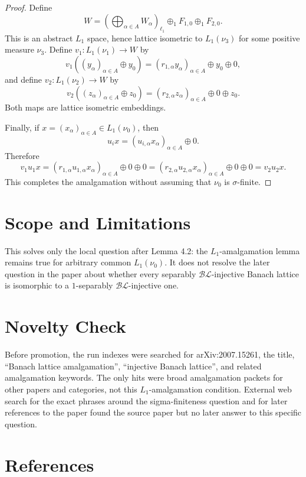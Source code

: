\documentclass[11pt]{article}
\newcommand{\BL}{\mathcal{BL}}
\newcommand{\Lone}{L_1}
\begin{document}
\begin{proof}
Define
\[
  W=
  \left(\bigoplus_{\alpha\in A}W_\alpha\right)_{\ell_1}
  \oplus_1 F_{1,0}\oplus_1 F_{2,0}.
\]
This is an abstract \(L_1\) space, hence lattice isometric to \(L_1(\nu_3)\)
for some positive measure \(\nu_3\).  Define \(v_1:\Lone(\nu_1)\to W\) by
\[
  v_1\left((y_\alpha)_{\alpha\in A}\oplus y_0\right)
  =
  (r_{1,\alpha}y_\alpha)_{\alpha\in A}\oplus y_0\oplus 0,
\]
and define \(v_2:\Lone(\nu_2)\to W\) by
\[
  v_2\left((z_\alpha)_{\alpha\in A}\oplus z_0\right)
  =
  (r_{2,\alpha}z_\alpha)_{\alpha\in A}\oplus 0\oplus z_0.
\]
Both maps are lattice isometric embeddings.

Finally, if \(x=(x_\alpha)_{\alpha\in A}\in \Lone(\nu_0)\), then
\[
  u_i x=(u_{i,\alpha}x_\alpha)_{\alpha\in A}\oplus 0.
\]
Therefore
\[
  v_1u_1x
  =(r_{1,\alpha}u_{1,\alpha}x_\alpha)_{\alpha\in A}\oplus0\oplus0
  =(r_{2,\alpha}u_{2,\alpha}x_\alpha)_{\alpha\in A}\oplus0\oplus0
  =v_2u_2x.
\]
This completes the amalgamation without assuming that \(\nu_0\) is
\(\sigma\)-finite.
\end{proof}

\section*{Scope and Limitations}

This solves only the local question after Lemma 4.2: the \(L_1\)-amalgamation
lemma remains true for arbitrary common \(L_1(\nu_0)\).  It does not resolve
the later question in the paper about whether every separably \(\BL\)-injective
Banach lattice is isomorphic to a \(1\)-separably \(\BL\)-injective one.

\section*{Novelty Check}

Before promotion, the run indexes were searched for arXiv:2007.15261, the
title, ``Banach lattice amalgamation'', ``injective Banach lattice'', and
related amalgamation keywords.  The only hits were broad amalgamation packets
for other papers and categories, not this \(L_1\)-amalgamation condition.
External web search for the exact phrases around the sigma-finiteness question
and for later references to the paper found the source paper but no later
answer to this specific question.

\section*{References}
\end{document}
